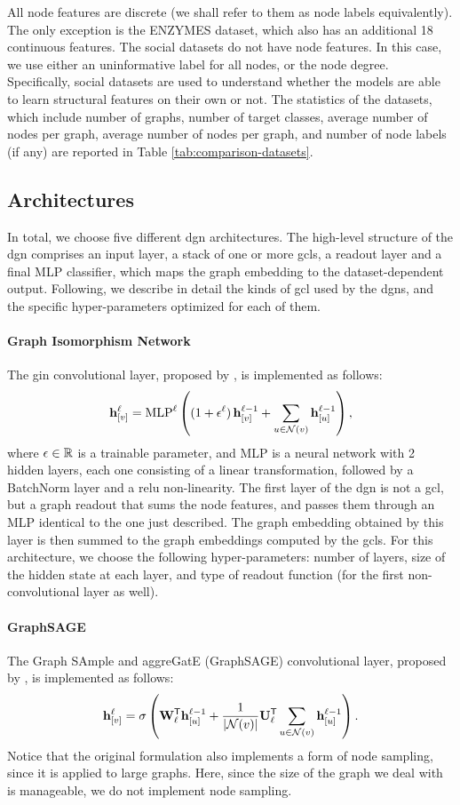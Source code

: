 All node features are discrete (we shall refer to them as node labels equivalently). The only exception is the ENZYMES dataset, which also has an additional 18 continuous features. The social datasets do not have node features. In this case, we use either an uninformative label for all nodes, or the node degree. Specifically, social datasets are used to understand whether the models are able to learn structural features on their own or not. The statistics of the datasets, which include number of graphs, number of target classes, average number of nodes per graph, average number of nodes per graph, and number of node labels (if any) are reported in Table \ref{tab:comparison-datasets}.


\subsection{Architectures}
In total, we choose five different \gls{dgn} architectures. The high-level structure of the \gls{dgn} comprises an input layer, a stack of one or more \glspl{gcl}, a readout layer and a final MLP classifier, which maps the graph embedding to the dataset-dependent output. Following, we describe in detail the kinds of \gls{gcl} used by the \glspl{dgn}, and the specific hyper-parameters optimized for each of them.

\paragraph{Graph Isomorphism Network} The \gls{gin} convolutional layer, proposed by \cite{?}, is implemented as follows:
$$\Elem{h}{v}^{\ell} = \Fun{MLP}^{\ell} \Paren{(1 + \epsilon^{\ell})\,\Elem{h}{v}^{\ell-1} + \sum_{u \in \Cal{N}(v)} \Elem{h}{u}^{\ell-1}},$$
where $\epsilon \in \mathbb{R}$ is a trainable parameter, and MLP is a neural network with 2 hidden layers, each one consisting of a linear transformation, followed by a BatchNorm layer and a \gls{relu} non-linearity. The first layer of the \gls{dgn} is not a \gls{gcl}, but a graph readout that sums the node features, and passes them through an MLP identical to the one just described. The graph embedding obtained by this layer is then summed to the graph embeddings computed by the \glspl{gcl}. For this architecture, we choose the following hyper-parameters: number of layers, size of the hidden state at each layer, and type of readout function (for the first non-convolutional layer as well).

\paragraph{GraphSAGE}
The Graph SAmple and aggreGatE (GraphSAGE) convolutional layer, proposed by \cite{?}, is implemented as follows:
$$\Elem{h}{v}^{\ell} = \sigma\Paren{\Matrix{W}^{\Transpose}_{\ell}\Elem{h}{u}^{\ell-1} + \frac{1}{|\Cal{N}(v)|} \Matrix{U}^{\Transpose}_{\ell} \sum_{u \in \Cal{N}(v)} \Elem{h}{u}^{\ell-1}}.$$
Notice that the original formulation also implements a form of node sampling, since it is applied to large graphs. Here, since the size of the graph we deal with is manageable, we do not implement node sampling.

